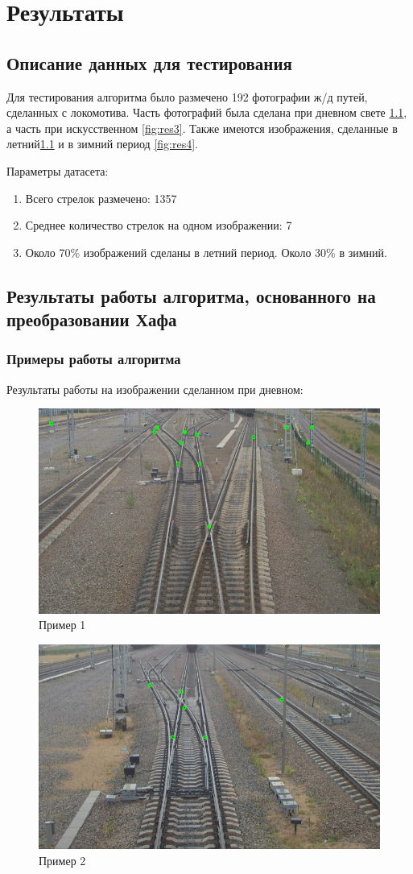 \chapter{Результаты}

\section{Описание данных для тестирования}
Для тестирования алгоритма было размечено 192 фотографии ж/д путей, сделанных с локомотива. Часть фотографий была сделана при дневном свете \ref{fig:res1}, а часть при искусственном \ref{fig:res3}. Также имеются изображения, сделанные в летний\ref{fig:res1} и в зимний период \ref{fig:res4}.

Параметры датасета:
\begin{enumerate}
	\item Всего стрелок размечено: 1357
	\item Среднее количество стрелок на одном изображении: 7
	\item Около 70\% изображений сделаны в летний период. Около 30\% в зимний.
\end{enumerate}

\section{Результаты работы алгоритма, основанного на преобразовании Хафа}
\subsection{Примеры работы алгоритма}
Результаты работы на изображении сделанном при дневном:
\begin{figure}[!h]
	\centering
	\includegraphics[width=0.7\linewidth]{pictures/screenshot0015}
	\caption{Пример 1}
	\label{fig:res1}
\end{figure}
\begin{figure}[!h]
	\centering
	\includegraphics[width=0.7\linewidth]{pictures/screenshot0016}
	\caption{Пример 2}
	\label{fig:res2}
\end{figure}
\newpage

